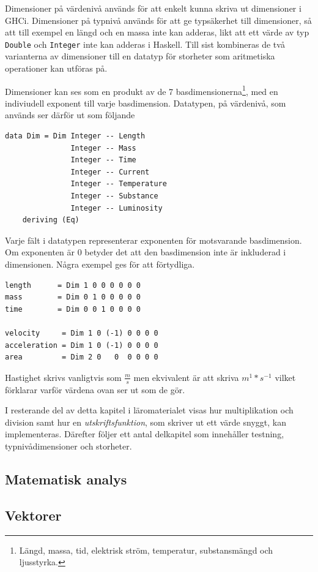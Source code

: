 Dimensioner på värdenivå används för att enkelt kunna skriva ut dimensioner i
GHCi. Dimensioner på typnivå används för att ge typsäkerhet till dimensioner, så
att till exempel en längd och en massa inte kan adderas, likt att ett värde av
typ \texttt{Double} och \texttt{Integer} inte kan adderas i Haskell. Till sist
kombineras de två varianterna av dimensioner till en datatyp för storheter som
aritmetiska operationer kan utföras på.

Dimensioner kan ses som en produkt av de 7 basdimensionerna\footnote{Längd,
massa, tid, elektrisk ström, temperatur, substansmängd och ljusstyrka.}, med en
indiviudell exponent till varje basdimension. Datatypen, på värdenivå, som
används ser därför ut som följande

\begin{lstlisting}
data Dim = Dim Integer -- Length
               Integer -- Mass
               Integer -- Time
               Integer -- Current
               Integer -- Temperature
               Integer -- Substance
               Integer -- Luminosity
    deriving (Eq)
\end{lstlisting}

Varje fält i datatypen representerar exponenten för motsvarande basdimension. Om
exponenten är $0$ betyder det att den basdimension inte är inkluderad i
dimensionen. Några exempel ges för att förtydliga.

\begin{lstlisting}
length      = Dim 1 0 0 0 0 0 0
mass        = Dim 0 1 0 0 0 0 0
time        = Dim 0 0 1 0 0 0 0

velocity     = Dim 1 0 (-1) 0 0 0 0
acceleration = Dim 1 0 (-1) 0 0 0 0
area         = Dim 2 0   0  0 0 0 0
\end{lstlisting}

Hastighet skrivs vanligtvis som $\frac{m}{s}$ men ekvivalent är att skriva
$m^1*s^{-1}$ vilket förklarar varför värdena ovan ser ut som de gör.

I resterande del av detta kapitel i läromaterialet visas hur multiplikation och
division samt hur en \textit{utskriftsfunktion}, som skriver ut ett värde
snyggt, kan implementeras. Därefter följer ett antal delkapitel som innehåller
testning, typnivådimensioner och storheter.

\subsection{Matematisk analys}

\subsection{Vektorer}

